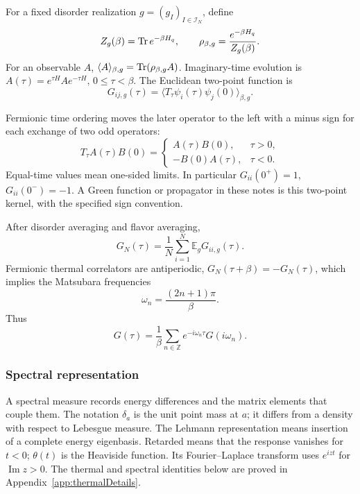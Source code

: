 \documentclass[11pt]{article}
\numberwithin{equation}{section}
\theoremstyle{exposition}
\theoremstyle{result}
\newcommand{\E}{\mathbb E}
\begin{document}
For a fixed disorder realization $g=(g_I)_{I\in\mathcal I_N}$, define
\begin{equation*}
Z_g(\beta)=\Tr e^{-\beta H_q},
\qquad
\rho_{\beta,g}=\frac{e^{-\beta H_q}}{Z_g(\beta)}.
\end{equation*}
For an observable $A$, $\langle A\rangle_{\beta,g}=\Tr(\rho_{\beta,g}A)$. Imaginary-time evolution is $A(\tau)=e^{\tau H}Ae^{-\tau H}, \, 0\le \tau<\beta$. The Euclidean two-point function is
\begin{equation*}
G_{ij,g}(\tau)=
\langle T_\tau \psi_i(\tau)\psi_j(0)\rangle_{\beta,g}.
\end{equation*}

Fermionic time ordering moves the later operator to the left with a minus sign for each exchange of two odd operators:
\begin{equation*}
T_\tau A(\tau)B(0)=
\begin{cases}A(\tau)B(0),&\tau>0,\\-B(0)A(\tau),&\tau<0.\end{cases}
\end{equation*}
Equal-time values mean one-sided limits. In particular $G_{ii}(0^+)=1$, $G_{ii}(0^-)=-1$. A Green function or propagator in these notes is this two-point kernel, with the specified sign convention.

After disorder averaging and flavor averaging,
\begin{equation}
G_N(\tau)=\frac1N\sum_{i=1}^{N}\E_g G_{ii,g}(\tau).
\label{eq:GN}
\end{equation}
Fermionic thermal correlators are antiperiodic, $G_N(\tau+\beta)=-G_N(\tau)$, which implies the Matsubara frequencies
\begin{equation*}
\omega_n=\frac{(2n+1)\pi}{\beta}.
\end{equation*}
Thus
\begin{equation*}
G(\tau)=\frac1\beta\sum_{n\in\mathbb Z}e^{-i\omega_n\tau}G(i\omega_n).
\end{equation*}

\subsubsection{Spectral representation}


A spectral measure records energy differences and the matrix elements that couple them. The notation $\delta_a$ is the unit point mass at $a$; it differs from a density with respect to Lebesgue measure. The Lehmann representation means insertion of a complete energy eigenbasis. Retarded means that the response vanishes for $t<0$; $\theta(t)$ is the Heaviside function. Its Fourier--Laplace transform uses $e^{izt}$ for $\operatorname{Im}z>0$. The thermal and spectral identities below are proved in Appendix~\ref{app:thermalDetails}.
\end{document}
